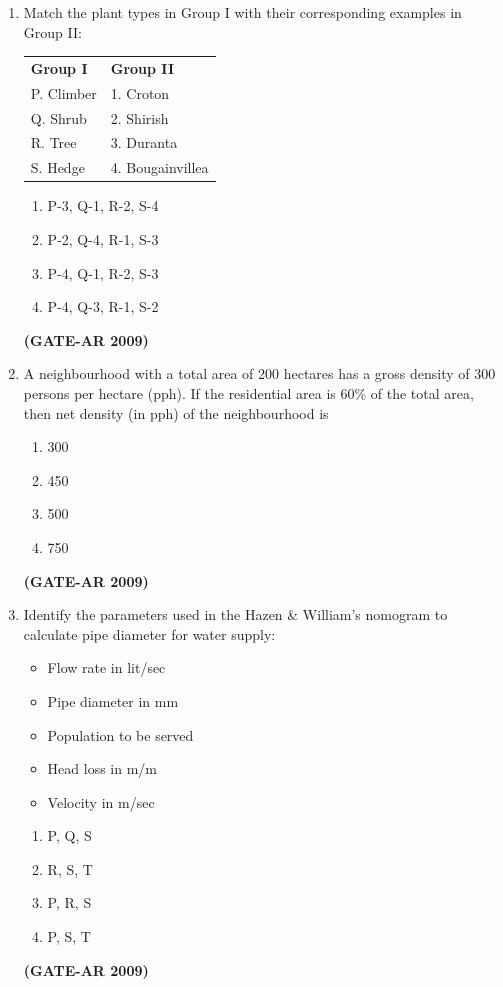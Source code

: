 \documentclass[a4paper,10pt]{article}
\begin{document}
\begin{enumerate}
	\item Match the plant types in Group I with their corresponding examples in Group II:  \\
    \begin{tabular}{ l l }
	\textbf{Group I} & \textbf{Group II} \\
	P. Climber & 1. Croton \\
	Q. Shrub & 2. Shirish \\
	R. Tree & 3. Duranta \\
	S. Hedge & 4. Bougainvillea \\
	\end{tabular}
	\begin{multicols}{2}
	\begin{enumerate}
        \item P-3, Q-1, R-2, S-4
        \item P-2, Q-4, R-1, S-3
        \item P-4, Q-1, R-2, S-3
        \item P-4, Q-3, R-1, S-2
    \end{enumerate}
	\end{multicols}
    \hfill \textbf{(GATE-AR 2009)}

    \item A neighbourhood with a total area of 200 hectares has a gross density of 300 persons per hectare (pph). If the residential area is 60\% of the total area, then net density (in pph) of the neighbourhood is 
    \begin{multicols}{4}
	\begin{enumerate}
        \item 300
        \item 450
        \item 500
        \item 750
    \end{enumerate}
	\end{multicols}
    \hfill \textbf{(GATE-AR 2009)}

    \item Identify the parameters used in the Hazen \& William’s nomogram to calculate pipe diameter for water supply: 
    \begin{itemize}
        \item Flow rate in lit/sec
        \item Pipe diameter in mm
        \item Population to be served
        \item Head loss in m/m
        \item Velocity in m/sec
    \end{itemize}
    \begin{multicols}{4}
	\begin{enumerate}
        \item P, Q, S
        \item R, S, T
        \item P, R, S
        \item P, S, T
    \end{enumerate}
	\end{multicols}
    \hfill \textbf{(GATE-AR 2009)}


\end{enumerate}
\end{document}
